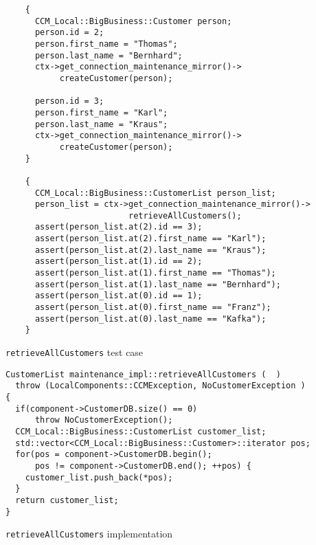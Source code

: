 \begin{Example}
\begin{minifbox}
\begin{small}
\begin{verbatim}
    {
      CCM_Local::BigBusiness::Customer person;
      person.id = 2;
      person.first_name = "Thomas";
      person.last_name = "Bernhard";
      ctx->get_connection_maintenance_mirror()->
           createCustomer(person);

      person.id = 3;
      person.first_name = "Karl";
      person.last_name = "Kraus";
      ctx->get_connection_maintenance_mirror()->
           createCustomer(person);
    }

    {
      CCM_Local::BigBusiness::CustomerList person_list;
      person_list = ctx->get_connection_maintenance_mirror()->
                         retrieveAllCustomers();
      assert(person_list.at(2).id == 3);
      assert(person_list.at(2).first_name == "Karl");
      assert(person_list.at(2).last_name == "Kraus");
      assert(person_list.at(1).id == 2);
      assert(person_list.at(1).first_name == "Thomas");
      assert(person_list.at(1).last_name == "Bernhard");
      assert(person_list.at(0).id == 1);
      assert(person_list.at(0).first_name == "Franz");
      assert(person_list.at(0).last_name == "Kafka");
    }      
\end{verbatim}
\end{small}
\end{minifbox}
\caption{{\tt retrieveAllCustomers} test case}
\label{example:retrieveAllCustomersTest}
\end{Example}


\begin{Example}
\begin{minifbox}
\begin{small}
\begin{verbatim}
CustomerList maintenance_impl::retrieveAllCustomers (  )
  throw (LocalComponents::CCMException, NoCustomerException )
{
  if(component->CustomerDB.size() == 0)
      throw NoCustomerException();
  CCM_Local::BigBusiness::CustomerList customer_list;
  std::vector<CCM_Local::BigBusiness::Customer>::iterator pos;
  for(pos = component->CustomerDB.begin(); 
      pos != component->CustomerDB.end(); ++pos) {
    customer_list.push_back(*pos);
  }
  return customer_list;
}
\end{verbatim}
\end{small}
\end{minifbox}
\caption{{\tt retrieveAllCustomers} implementation }
\label{example:retrieveAllCustomersImpl}
\end{Example}

